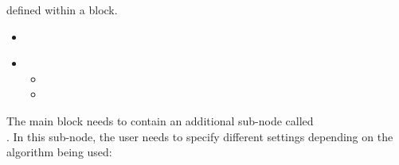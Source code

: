 defined within a  block.
%
\attrIntro
\begin{itemize}
\itemsep0em
\item \nameDescription
\end{itemize}
\begin{itemize}
  \item \variableDescription
    \variableChildrenIntro
    \begin{itemize}
      \item \distributionDescription
      \item \gridDescription
    \end{itemize}
\end{itemize}

The main  block needs to contain an additional sub-node
called\\.
%
In this sub-node, the user needs to specify different settings depending on the
algorithm being used:
